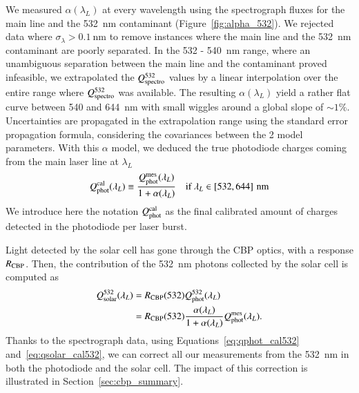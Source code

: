 We measured $\alpha(\lambda_L)$ at every wavelength using the spectrograph fluxes for the main line and the \SI{532}{nm} contaminant (Figure~\ref{fig:alpha_532}). We rejected data where $\sigma_{\lambda} > \SI{0.1}{\nm}$ to remove instances where the main line and the \SI{532}{nm} contaminant are poorly separated. In the 532 - \SI{540}{nm} range, where an unambiguous separation between the main line and the contaminant proved infeasible, we extrapolated the $Q_{\mathrm{spectro}}^{532}$ values by a linear interpolation over the entire range where $Q_{\mathrm{spectro}}^{532}$ was available.
The resulting $\alpha(\lambda_L)$ yield a rather flat curve between 540 and \SI{644}{\nm} with small wiggles around a global slope of $\sim 1\% $.
Uncertainties are propagated in the extrapolation range using the standard error propagation formula, considering the covariances between the 2 model parameters. With this $\alpha$ model, we deduced the true photodiode charges coming from the main laser line at $\lambda_L$
\begin{equation}
        Q_{\mathrm{phot}}^{\mathrm{cal}}(\lambda_L) \equiv  \frac{Q_{\mathrm{phot}}^{\mathrm{mes}}(\lambda_L)}{1 + \alpha(\lambda_L)} \quad\text{if}\ \lambda_L \in \left[532, 644\right]\mathrm{\,nm}\label{eq:qphot_cal532}
\end{equation}
We introduce here the notation $Q_{\mathrm{phot}}^{\mathrm{cal}}$ as the final calibrated amount of charges detected in the photodiode per laser burst. 

Light detected by the solar cell has gone through the CBP optics, with a response $R_{\mathrm{CBP}}$.
Then, the contribution of the \SI{532}{\nano\meter} photons collected by the solar cell is computed as
\begin{equation}
\begin{aligned}
    Q_{\mathrm{solar}}^{532}(\lambda_L) & = R_{\mathrm{CBP}}(532)  Q_{\mathrm{phot}}^{532}(\lambda_L) \\ 
    & = R_{\mathrm{CBP}}(532) \frac{ \alpha(\lambda_L) }{1+ \alpha(\lambda_L)} Q_{\mathrm{phot}}^{\mathrm{mes}}(\lambda_L).
    \label{eq:qsolar_cal532}
\end{aligned}
\end{equation}
Thanks to the spectrograph data, using Equations~\ref{eq:qphot_cal532} and~\ref{eq:qsolar_cal532}, we can correct all our measurements from the \SI{532}{\nano\meter} in both the photodiode and the solar cell. The impact of this correction is illustrated in Section~\ref{sec:cbp_summary}.


